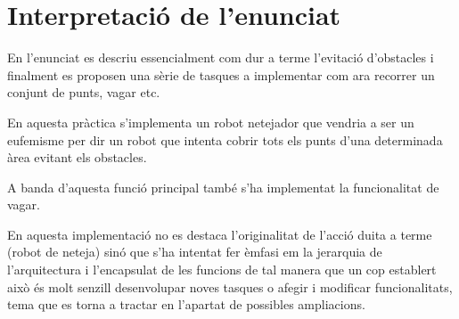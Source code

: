\section{Interpretació de l'enunciat}

En l'enunciat es descriu essencialment com dur a terme l'evitació d'obstacles i finalment
es proposen una sèrie de tasques a implementar com ara recorrer un conjunt de punts, vagar etc.

En aquesta pràctica s'implementa un robot netejador que vendria a ser un eufemisme per dir un
robot que intenta cobrir tots els punts d'una determinada àrea evitant els obstacles.

A banda d'aquesta funció principal també s'ha implementat la funcionalitat de vagar.

En aquesta implementació no es destaca l'originalitat de l'acció duita a terme (robot de neteja)
sinó que s'ha intentat fer èmfasi em la jerarquia de l'arquitectura i l'encapsulat de les funcions de tal
manera que un cop establert això és molt senzill desenvolupar noves tasques o afegir i modificar
funcionalitats, tema que es torna a tractar en l'apartat de possibles ampliacions.
